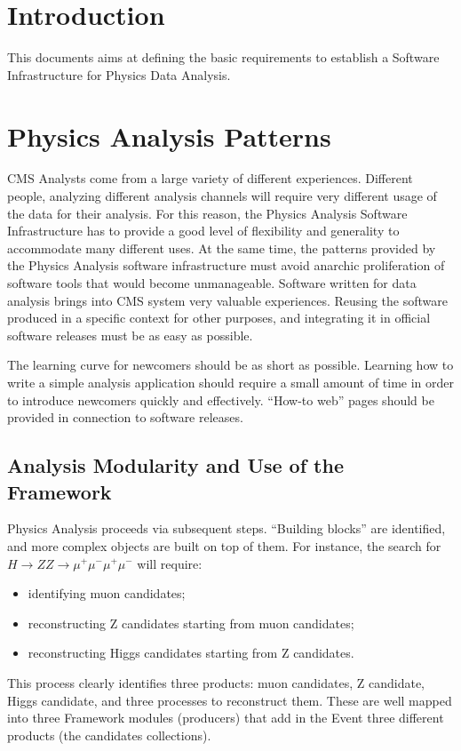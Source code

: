 \documentclass[draftmode]{memarticle}
\begin{document}
\topmatter

\chapter{Introduction}

This documents aims at defining the basic requirements 
to establish a Software Infrastructure for Physics Data Analysis.

\chapter{Physics Analysis Patterns}

CMS Analysts come from a large variety of different experiences.
Different people, analyzing different analysis channels will require
very different usage of the data for their analysis.
For this reason, the Physics Analysis Software Infrastructure has to provide
a good level of flexibility and generality to accommodate many
different uses.
At the same time, the patterns provided by the Physics Analysis 
software infrastructure must avoid anarchic proliferation of
software tools that would become unmanageable. 
Software written for data analysis
brings into CMS system very valuable experiences. 
Reusing the software produced in a specific context for other
purposes, and integrating it in official software releases
must be as easy as possible.  

The learning curve for newcomers should be as short as possible.
Learning how to write a simple analysis application 
should require a small amount of time in order to introduce
newcomers quickly and effectively. ``How-to web'' pages should
be provided in connection to software releases.

\section{Analysis Modularity and Use of the Framework}

Physics Analysis proceeds via subsequent steps. ``Building blocks''
are identified, and more complex objects are built on top of
them. For instance, the search for 
$H\rightarrow Z Z\rightarrow \mu^+\mu^-\mu^+\mu^-$ will require:
\begin{itemize}
\item{} identifying muon candidates;
\item{} reconstructing Z candidates starting from muon candidates;
\item{} reconstructing Higgs candidates starting from Z candidates.
\end{itemize}
This process clearly identifies three products: muon candidates,
Z candidate, Higgs candidate, and three processes to reconstruct 
them. These are well mapped into three Framework modules
(producers) that add in the Event three different products
(the candidates collections). 
\end{document}

